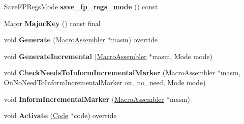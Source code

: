 \begin{DoxyCompactItemize}
\item 
Save\+F\+P\+Regs\+Mode {\bfseries save\+\_\+fp\+\_\+regs\+\_\+mode} () const \hypertarget{classv8_1_1internal_1_1_record_write_stub_a958cf062d6f62adc812d2df9b92bd24a}{}\label{classv8_1_1internal_1_1_record_write_stub_a958cf062d6f62adc812d2df9b92bd24a}

\item 
Major {\bfseries Major\+Key} () const  final\hypertarget{classv8_1_1internal_1_1_record_write_stub_aa48ea86c84fbc9af6c238be1b4b8fa8d}{}\label{classv8_1_1internal_1_1_record_write_stub_aa48ea86c84fbc9af6c238be1b4b8fa8d}

\item 
void {\bfseries Generate} (\hyperlink{classv8_1_1internal_1_1_macro_assembler}{Macro\+Assembler} $\ast$masm) override\hypertarget{classv8_1_1internal_1_1_record_write_stub_a71cb55552be288a12876045441a66dca}{}\label{classv8_1_1internal_1_1_record_write_stub_a71cb55552be288a12876045441a66dca}

\item 
void {\bfseries Generate\+Incremental} (\hyperlink{classv8_1_1internal_1_1_macro_assembler}{Macro\+Assembler} $\ast$masm, Mode mode)\hypertarget{classv8_1_1internal_1_1_record_write_stub_a05cf08ed0350334ba02a2e918b42ffcc}{}\label{classv8_1_1internal_1_1_record_write_stub_a05cf08ed0350334ba02a2e918b42ffcc}

\item 
void {\bfseries Check\+Needs\+To\+Inform\+Incremental\+Marker} (\hyperlink{classv8_1_1internal_1_1_macro_assembler}{Macro\+Assembler} $\ast$masm, On\+No\+Need\+To\+Inform\+Incremental\+Marker on\+\_\+no\+\_\+need, Mode mode)\hypertarget{classv8_1_1internal_1_1_record_write_stub_aa80cd82bd6fa0cdc17b5cb2d17540d59}{}\label{classv8_1_1internal_1_1_record_write_stub_aa80cd82bd6fa0cdc17b5cb2d17540d59}

\item 
void {\bfseries Inform\+Incremental\+Marker} (\hyperlink{classv8_1_1internal_1_1_macro_assembler}{Macro\+Assembler} $\ast$masm)\hypertarget{classv8_1_1internal_1_1_record_write_stub_a18e17a353df1617947581e3e6b9e9183}{}\label{classv8_1_1internal_1_1_record_write_stub_a18e17a353df1617947581e3e6b9e9183}

\item 
void {\bfseries Activate} (\hyperlink{classv8_1_1internal_1_1_code}{Code} $\ast$code) override\hypertarget{classv8_1_1internal_1_1_record_write_stub_aee832e64590d152a601ed41c5e4fdac9}{}\label{classv8_1_1internal_1_1_record_write_stub_aee832e64590d152a601ed41c5e4fdac9}


\end{DoxyCompactItemize}
